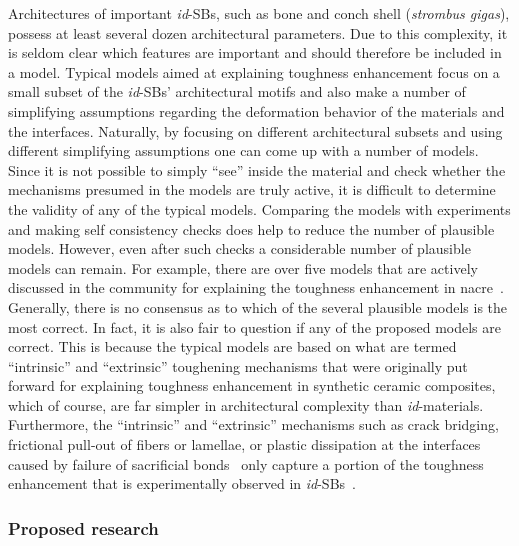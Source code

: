 \documentclass[10pt,letterpaper]{article}
\begin{document}
Architectures of important \textit{id}-SBs, such as bone and conch shell (\textit{strombus gigas}), possess at least several dozen architectural parameters. Due to this complexity, it is seldom clear which features are important and should therefore be included in a model. Typical models aimed at explaining toughness enhancement focus on a small subset of the \textit{id}-SBs' architectural motifs and also make a number of simplifying assumptions regarding the deformation behavior of the materials and the interfaces. Naturally, by focusing on different architectural subsets and using different simplifying assumptions one can come up with a number of models. Since it is not possible to simply ``see'' inside the material and check whether the mechanisms presumed in the models are truly active, it is difficult to determine the validity of any of the typical models. Comparing the models with experiments and making self consistency checks does help to reduce the number of plausible models. However, even after such checks a considerable number of plausible models can remain.  For example, there are over five models that are actively discussed in the community for explaining the toughness enhancement in nacre~\cite{barthelat2007mechanics,smith1999molecular,meyers2008mechanical,li2004nanoscale,lin2006mechanical,chen2013bio}. Generally, there is no consensus as to which of the several plausible models is the most correct. In fact, it is also fair to question if any of the proposed models are correct. This is because the typical models are based on what are termed ``intrinsic'' and ``extrinsic'' toughening mechanisms that were originally put forward for explaining toughness enhancement in synthetic ceramic composites, which of course, are far simpler in architectural complexity than \textit{id}-materials. Furthermore, the ``intrinsic'' and ``extrinsic'' mechanisms such as crack bridging, frictional pull-out of fibers or lamellae, or plastic dissipation at the interfaces caused by failure of sacrificial bonds~\cite{dunlop2011artful} only capture a portion of the toughness enhancement that is experimentally observed in \textit{id}-SBs~\cite{currey1976further, jackson1988mechanical, kamat2000structural, barthelat2007experimental}.



\subsubsection{Proposed research}
\end{document}
